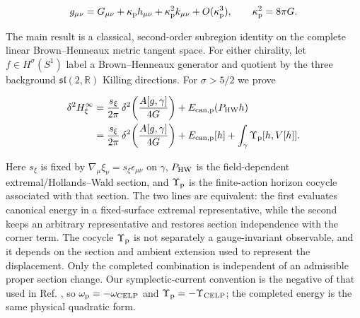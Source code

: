 \begin{align}
g_{\mu\nu}
=G_{\mu\nu}+\kappa_{\rm p}h_{\mu\nu}
+\kappa_{\rm p}^{2}k_{\mu\nu}+O(\kappa_{\rm p}^{3}),
\qquad \kappa_{\rm p}^{2}=8\pi G .
\end{align}

The main result is a classical, second-order subregion identity on the complete linear Brown--Henneaux metric tangent space. For either chirality, let $f\in H^\sigma(S^1)$ label a Brown--Henneaux generator and quotient by the three background $\mathfrak{sl}(2,\mathbb R)$ Killing directions. For $\sigma>5/2$ we prove

\begin{align}
\delta^2H_\xi^\infty
&=\frac{s_\xi}{2\pi}\,
\delta^2\!\left(\frac{A[g,\gamma]}{4G}\right)
+E_{{\rm can,p}}(P_{\rm HW}h) \label{eq:intro-main-hw}\\
&=\frac{s_\xi}{2\pi}\,
\delta^2\!\left(\frac{A[g,\gamma]}{4G}\right)
+E_{{\rm can,p}}[h]
+\int_\gamma\Upsilon_{\rm p}[h,V[h]] .
\end{align}

Here $s_\xi$ is fixed by $\nabla_\mu\xi_\nu=s_\xi\epsilon_{\mu\nu}$ on $\gamma$, $P_{\rm HW}$ is the field-dependent extremal/Hollands--Wald section, and $\Upsilon_{\rm p}$ is the finite-action horizon cocycle associated with that section. The two lines are equivalent: the first evaluates canonical energy in a fixed-surface extremal representative, while the second keeps an arbitrary representative and restores section independence with the corner term. The cocycle $\Upsilon_{\rm p}$ is not separately a gauge-invariant observable, and it depends on the section and ambient extension used to represent the displacement. Only the completed combination is independent of an admissible proper section change. Our symplectic-current convention is the negative of that used in Ref. \cite{ColinEllerin:2025gravitons}, so $\omega_{\rm p}=-\omega_{\rm CELP}$ and $\Upsilon_{\rm p}=-\Upsilon_{\rm CELP}$; the completed energy is the same physical quadratic form.

